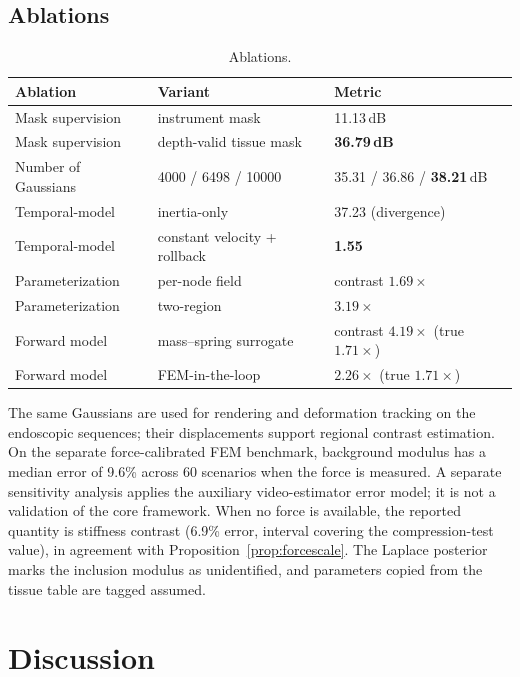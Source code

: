 \documentclass[pdflatex,lineno,referee,sn-vancouver,Numbered]{sn-jnl}
\begin{document}
\subsection{Ablations}
\begin{table}[htbp]
\centering
\caption{Ablations.}
\label{tab:ablation}
\footnotesize
\begin{tabular}{lll}
\toprule
Ablation & Variant & Metric \\
\midrule
Mask supervision & instrument mask & 11.13\,dB \\
Mask supervision & depth-valid tissue mask & \textbf{36.79\,dB} \\
Number of Gaussians & 4000 / 6498 / 10000 & 35.31 / 36.86 / \textbf{38.21}\,dB \\
Temporal-model & inertia-only & 37.23 (divergence) \\
Temporal-model & constant velocity + rollback & \textbf{1.55} \\
Parameterization & per-node field & contrast $1.69\times$ \\
Parameterization & two-region & \textbf{$3.19\times$} \\
Forward model & mass--spring surrogate & contrast $4.19\times$ (true $1.71\times$) \\
Forward model & FEM-in-the-loop & \textbf{$2.26\times$} (true $1.71\times$) \\
\bottomrule
\end{tabular}
\end{table}

The same Gaussians are used for rendering and deformation tracking on the
endoscopic sequences; their displacements support regional contrast
estimation. On the separate force-calibrated FEM benchmark, background
modulus has a median error of 9.6\% across 60 scenarios when the force is
measured. A separate sensitivity analysis applies the auxiliary
video-estimator error model; it is not a validation of the core
framework. When no
force is available, the reported quantity is stiffness contrast (6.9\%
error, interval covering the compression-test value), in agreement with
Proposition~\ref{prop:forcescale}. The Laplace posterior marks the
inclusion modulus as unidentified, and parameters copied from the tissue
table are tagged assumed.

\section{Discussion}
\label{sec:discussion}
\end{document}
